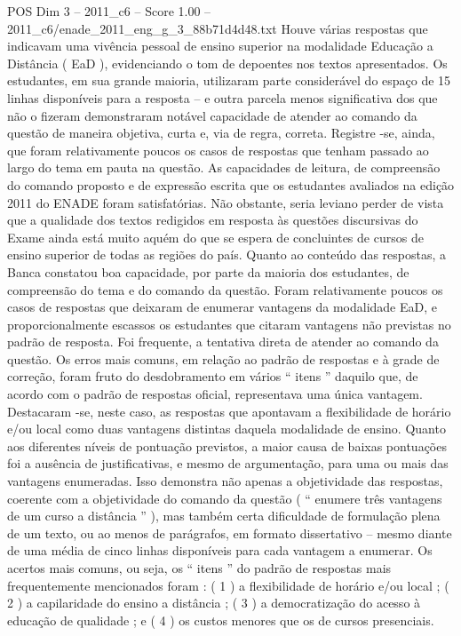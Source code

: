 \begin{textsample}{POS Dim 3 – 2011\_c6 – Score 1.00 – 2011\_c6/enade\_2011\_eng\_g\_3\_88b71d4d48.txt}
Houve várias respostas que indicavam uma vivência pessoal de ensino superior na modalidade Educação a Distância ( EaD ), evidenciando o tom de depoentes nos textos apresentados.
Os estudantes, em sua grande maioria, utilizaram parte considerável do espaço de 15 linhas disponíveis para a resposta – e outra parcela menos significativa dos que não o fizeram demonstraram notável capacidade de atender ao comando da questão de maneira objetiva, curta e, via de regra, correta.
Registre -se, ainda, que foram relativamente poucos os casos de respostas que tenham passado ao largo do tema em pauta na questão.
As capacidades de leitura, de compreensão do comando proposto e de expressão escrita que os estudantes avaliados na edição 2011 do ENADE foram satisfatórias.
Não obstante, seria leviano perder de vista que a qualidade dos textos redigidos em resposta às questões discursivas do Exame ainda está muito aquém do que se espera de concluintes de cursos de ensino superior de todas as regiões do país.
Quanto ao conteúdo das respostas, a Banca constatou boa capacidade, por parte da maioria dos estudantes, de compreensão do tema e do comando da questão.
Foram relativamente poucos os casos de respostas que deixaram de enumerar vantagens da modalidade EaD, e proporcionalmente escassos os estudantes que citaram vantagens não previstas no padrão de resposta.
Foi frequente, a tentativa direta de atender ao comando da questão.
Os erros mais comuns, em relação ao padrão de respostas e à grade de correção, foram fruto do desdobramento em vários “ itens ” daquilo que, de acordo com o padrão de respostas oficial, representava uma única vantagem.
Destacaram -se, neste caso, as respostas que apontavam a flexibilidade de horário e/ou local como duas vantagens distintas daquela modalidade de ensino.
Quanto aos diferentes níveis de pontuação previstos, a maior causa de baixas pontuações foi a ausência de justificativas, e mesmo de argumentação, para uma ou mais das vantagens enumeradas.
Isso demonstra não apenas a objetividade das respostas, coerente com a objetividade do comando da questão ( “ enumere três vantagens de um curso a distância ” ), mas também certa dificuldade de formulação plena de um texto, ou ao menos de parágrafos, em formato dissertativo – mesmo diante de uma média de cinco linhas disponíveis para cada vantagem a enumerar.
Os acertos mais comuns, ou seja, os “ itens ” do padrão de respostas mais frequentemente mencionados foram : ( 1 ) a flexibilidade de horário e/ou local ; ( 2 ) a capilaridade do ensino a distância ; ( 3 ) a democratização do acesso à educação de qualidade ; e ( 4 ) os custos menores que os de cursos presenciais.

\end{textsample}
